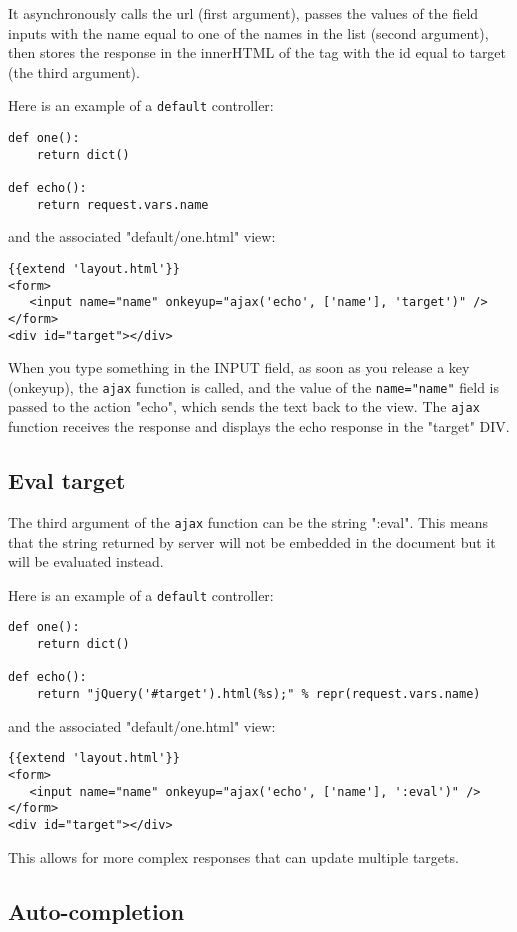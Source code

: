 \documentclass[justified,sixbynine,notoc]{tufte-book}
\def\ft{\small\tt}
\begin{document}
\begin{fullwidth}
It asynchronously calls the url (first argument), passes the values of the field inputs with the name equal to one of the names in the list (second argument), then stores the response in the innerHTML of the tag with the id equal to target (the third argument).

Here is an example of a {\ft default} controller:
\begin{lstlisting}
def one():
    return dict()

def echo():
    return request.vars.name
\end{lstlisting}
\noindent and the associated "default/one.html" view:
\begin{lstlisting}[keywords={}]
{{extend 'layout.html'}}
<form>
   <input name="name" onkeyup="ajax('echo', ['name'], 'target')" />
</form>
<div id="target"></div>
\end{lstlisting}

When you type something in the INPUT field, as soon as you release a key (onkeyup), the {\ft ajax} function is called, and the value of the {\ft name="name"} field is passed to the action "echo", which sends the text back to the view. The {\ft ajax} function receives the response and displays the echo response in the "target" DIV.

\goodbreak\subsection{Eval target}

The third argument of the {\ft ajax} function can be the string ":eval". This means that the string returned by server will not be embedded in the document but it will be evaluated instead.

Here is an example of a {\ft default} controller:
\begin{lstlisting}
def one():
    return dict()

def echo():
    return "jQuery('#target').html(%s);" % repr(request.vars.name)
\end{lstlisting}
\noindent and the associated "default/one.html" view:
\begin{lstlisting}[keywords={}]
{{extend 'layout.html'}}
<form>
   <input name="name" onkeyup="ajax('echo', ['name'], ':eval')" />
</form>
<div id="target"></div>
\end{lstlisting}

This allows for more complex responses that can update multiple targets.

\goodbreak\subsection{Auto-completion}


\end{fullwidth}
\end{document}
